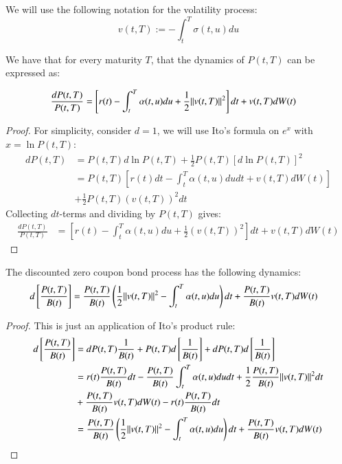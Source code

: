 \begin{notation}
We will use the following notation for the volatility process:
\[
v(t,T) := -\int_{t}^{T}\sigma(t,u)du
\]
\end{notation}

\begin{lemma} 
We have that for every maturity $T$, that the dynamics of $P(t,T)$
can be expressed as:

\begin{align*}
\frac{dP(t,T)}{P(t,T)}
&= \left[
r(t) - \int_{t}^{T}\alpha(t,u)du + \frac{1}{2}
\norm{v(t,T)}^{2}
\right]dt 
+ v(t,T)dW(t)
\end{align*}
\end{lemma} 

\begin{proof}
For simplicity, consider $d=1$,
we will use Ito's formula on $e^{x}$ with $x = \ln{P(t,T)}$: 
\begin{align*}
dP(t,T) &= P(t,T)d\ln{P(t,T)} + \frac{1}{2}P(t,T)[d\ln{P(t,T)}]^{2} \\ 
&= P(t,T)\left[
r(t)dt -\int_{t}^{T}\alpha(t,u)dudt 
+ v(t,T)dW(t)
\right] \\ 
&+ \frac{1}{2}P(t,T)\left(
v(t,T)
\right)^{2}dt
\end{align*} 
Collecting $dt$-terms and dividing by $P(t,T)$ gives: 
\begin{align*}
\frac{dP(t,T)}{P(t,T)} &= 
\left[
r(t) - \int_{t}^{T}\alpha(t,u)du + \frac{1}{2}\left(
v(t,T) \right)^{2}
\right]dt 
+ v(t,T)dW(t)
\end{align*}

\end{proof}

\begin{corollary}
The discounted zero coupon bond process has the following dynamics: 
\begin{align}
\label{eq: discounted_ZCB_dynamics_P}
d\left[
\frac{P(t,T)}{B(t)}
\right]
&= 
\frac{P(t,T)}{B(t)}\left(
\frac{1}{2}\norm{v(t,T)}^{2} - \int_{t}^{T}\alpha(t,u)du
\right)dt 
+ 
\frac{P(t,T)}{B(t)}v(t,T)dW(t)
\end{align}
\end{corollary}

\begin{proof}
This is just an application of Ito's product rule:
\begin{align*}
d\left[
\frac{P(t,T)}{B(t)}
\right] 
&= 
dP(t,T)\frac{1}{B(t)} + P(t,T)d\left[\frac{1}{B(t)}\right] +dP(t,T)d\left[\frac{1}{B(t)}\right] \\ 
&= 
r(t)\frac{P(t,T)}{B(t)}dt - \frac{P(t,T)}{B(t)}\int_{t}^{T}\alpha(t,u)dudt 
+\frac{1}{2}\frac{P(t,T)}{B(t)}\norm{v(t,T)}^{2}dt \\
&+\frac{P(t,T)}{B(t)}v(t,T)dW(t) - r(t)\frac{P(t,T)}{B(t)}dt \\ 
&= 
\frac{P(t,T)}{B(t)}\left(
\frac{1}{2}\norm{v(t,T)}^{2} - \int_{t}^{T}\alpha(t,u)du
\right)dt 
+ 
\frac{P(t,T)}{B(t)}v(t,T)dW(t)
\end{align*}
\end{proof}

